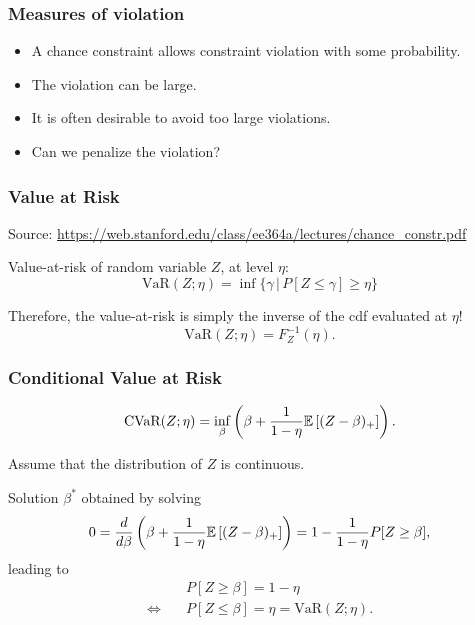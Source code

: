 \documentclass{beamer}
\begin{document}
\begin{frame}
\frametitle{Measures of violation}

\begin{itemize}
\item 
A chance constraint allows constraint violation with some probability.
\item
The violation can be large.
\item
It is often desirable to avoid too large violations.
\item
Can we penalize the violation?
\end{itemize}

\end{frame}

\begin{frame}
\frametitle{Value at Risk}

Source: \url{https://web.stanford.edu/class/ee364a/lectures/chance_constr.pdf}

\mbox{}

Value-at-risk of random variable $Z$, at level $\eta$:
$$
\text{VaR}(Z;\eta) = \inf \{ \gamma \,|\, P[Z \leq \gamma] \geq \eta \}
$$

\mbox{}

Therefore, the value-at-risk is simply the inverse of the cdf evaluated at $\eta$!
$$
\text{VaR}(Z;\eta) = F_Z^{-1}(\eta).
$$

\end{frame}

\begin{frame}
\frametitle{Conditional Value at Risk}

$$
\text{CVaR}(Z; \eta) = \inf_{\beta} \left( \beta + \frac{1}{1 - \eta} {\mathbb{E}} \left[ (Z - \beta)_+ \right] \right).
$$

\mbox{}

Assume that the distribution of $Z$ is continuous.

\mbox{}

Solution $\beta^*$ obtained by solving
$$
0 = \frac{d}{d \beta} \left( \beta + \frac{1}{1 - \eta} {\mathbb{E}} \left[ (Z - \beta)_+ \right] \right)
= 1 - \frac{1}{1 - \eta} P[ Z \geq \beta ],
$$
leading to
\begin{align*}
& P[ Z \geq \beta ] = 1 - \eta \\
\Leftrightarrow \quad & P[ Z \leq \beta ] = \eta = \text{VaR}(Z; \eta).
\end{align*}

\end{frame}
\end{document}
